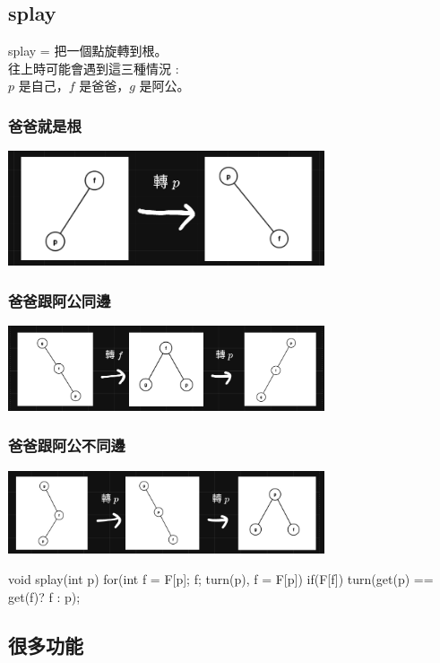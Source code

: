         \subsection{splay}
        splay = 把一個點旋轉到根。\\
        往上時可能會遇到這三種情況 : \\
        $p$ 是自己，$f$ 是爸爸，$g$ 是阿公。\\
            \subsubsection{爸爸就是根}
            \includegraphics*[width = 0.7\textwidth]{images/Froot}
            \subsubsection{爸爸跟阿公同邊}
            \includegraphics*[width = 0.7\textwidth]{images/FGsame}
            \subsubsection{爸爸跟阿公不同邊}
            \includegraphics*[width = 0.7\textwidth]{images/FGdif}
        \begin{C++}
        void splay(int p){
            for(int f = F[p]; f; turn(p), f = F[p]){
                if(F[f]) turn(get(p) == get(f)? f : p);
            }
        }
        \end{C++}
        \subsection{很多功能}
